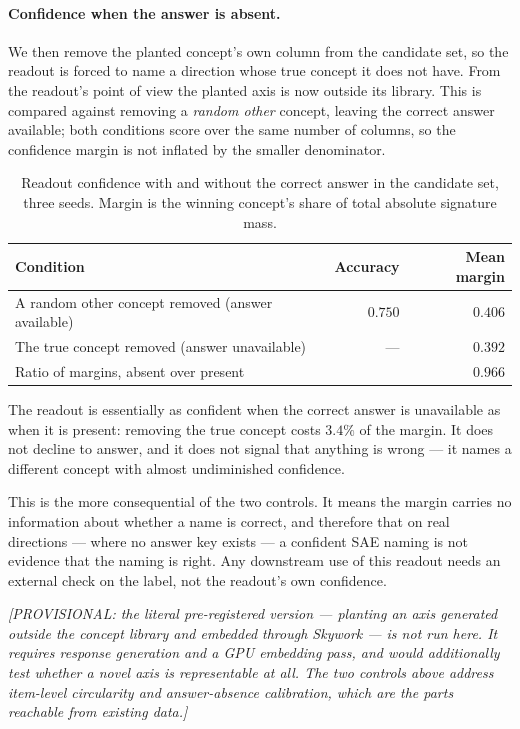 \paragraph{Confidence when the answer is absent.} We then remove the planted
concept's own column from the candidate set, so the readout is forced to name a
direction whose true concept it does not have. From the readout's point of view
the planted axis is now outside its library. This is compared against removing a
\emph{random other} concept, leaving the correct answer available; both
conditions score over the same number of columns, so the confidence margin is
not inflated by the smaller denominator.

\begin{table}[h]
\centering
\begin{tabular}{lrr}
\toprule
Condition & Accuracy & Mean margin \\
\midrule
A random other concept removed (answer available) & $0.750$ & $0.406$ \\
The true concept removed (answer unavailable)     & ---     & $0.392$ \\
\midrule
\multicolumn{2}{l}{Ratio of margins, absent over present} & $0.966$ \\
\bottomrule
\end{tabular}
\caption{Readout confidence with and without the correct answer in the candidate
set, three seeds. Margin is the winning concept's share of total absolute
signature mass.}
\label{tab:planted-absent}
\end{table}

The readout is essentially as confident when the correct answer is unavailable
as when it is present: removing the true concept costs $3.4\%$ of the margin.
It does not decline to answer, and it does not signal that anything is wrong ---
it names a different concept with almost undiminished confidence.

This is the more consequential of the two controls. It means the margin carries
no information about whether a name is correct, and therefore that on real
directions --- where no answer key exists --- a confident SAE naming is not
evidence that the naming is right. Any downstream use of this readout needs an
external check on the label, not the readout's own confidence.

\emph{[PROVISIONAL: the literal pre-registered version --- planting an axis
generated outside the concept library and embedded through Skywork --- is not
run here. It requires response generation and a GPU embedding pass, and would
additionally test whether a novel axis is representable at all. The two controls
above address item-level circularity and answer-absence calibration, which are
the parts reachable from existing data.]}

